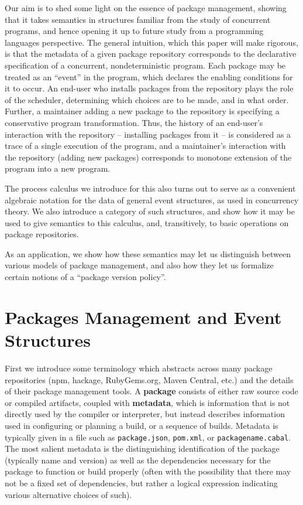 \documentclass[hoptionsi,review,screen,format=sigconf]{acmart}
\theoremstyle{definition}
\begin{document}
Our aim is to shed some light on the essence of package management, showing that it takes semantics in structures familiar from the study of concurrent programs, and hence opening it up to future study from a programming languages perspective. The general intuition, which this paper will make rigorous, is that the metadata of a given package repository corresponds to the declarative specification of a concurrent, nondeterministic program. Each package may be treated as an ``event'' in the program, which declares the enabling conditions for it to occur. An end-user who installs packages from the repository plays the role of the scheduler, determining which choices are to be made, and in what order. Further, a maintainer adding a new package to the repository is specifying a conservative program transformation. Thus, the history of an end-user's interaction with the repository -- installing packages from it -- is considered as a trace of a single execution of the program, and a maintainer's interaction with the repository (adding new packages) corresponds to monotone extension of the program into a new program.

The process calculus we introduce for this also turns out to serve as a convenient algebraic notation for the data of general event structures, as used in concurrency theory. We also introduce a category of such structures, and show how it may be used to give semantics to this calculus, and, transitively, to basic operations on package repositories.

As an application, we show how these semantics may let us distinguish between various models of package management, and also how they let us formalize certain notions of a ``package version policy''.

\section{Packages Management and Event Structures}
First we introduce some terminology which abstracts across many package repositories (npm, hackage, RubyGems.org, Maven Central, etc.) and the details of their package management tools. A \textbf{package} consists of either raw source code or compiled artifacts, coupled with \textbf{metadata}, which is information that is not directly used by the compiler or interpreter, but instead describes information used in configuring or planning a build, or a sequence of builds. Metadata is typically   given in a file such as \texttt{package.json},  \texttt{pom.xml}, or \texttt{packagename.cabal}. The most salient metadata is the distinguishing identification of the package (typically name and version) as well as the dependencies necessary for the package to function or build properly (often with the possibility that there may not be a fixed set of dependencies, but rather a logical expression indicating various alternative choices of such).
\end{document}
